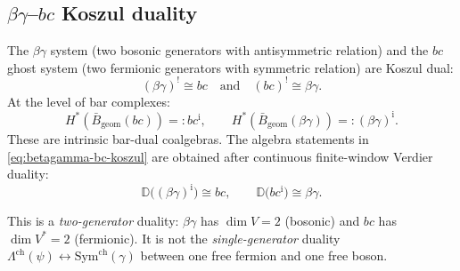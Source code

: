 \subsection{\texorpdfstring{$\beta\gamma$--$bc$}{beta-gamma--bc} Koszul duality}\label{sec:fermion-boson-koszul}

\begin{theorem}\label{thm:betagamma-bc-koszul}
The $\beta\gamma$ system (two bosonic generators with antisymmetric relation) and the $bc$ ghost system (two fermionic generators with symmetric relation) are Koszul dual:
\begin{equation}\label{eq:betagamma-bc-koszul}
(\beta\gamma)^! \cong bc \quad \text{and} \quad (bc)^! \cong \beta\gamma.
\end{equation}
At the level of bar complexes:
\[
H^*(\bar{B}_{\mathrm{geom}}(bc))=:bc^{\mathrm i},\qquad
H^*(\bar{B}_{\mathrm{geom}}(\beta\gamma))
=:(\beta\gamma)^{\mathrm i}.
\]
These are intrinsic bar-dual coalgebras. The algebra statements in
\eqref{eq:betagamma-bc-koszul} are obtained after continuous
finite-window Verdier duality:
\[
\mathbb D\bigl((\beta\gamma)^{\mathrm i}\bigr)\cong bc,\qquad
\mathbb D\bigl(bc^{\mathrm i}\bigr)\cong \beta\gamma.
\]
\end{theorem}

\begin{remark}
This is a \emph{two-generator} duality: $\beta\gamma$ has
$\dim V = 2$ (bosonic) and $bc$ has $\dim V^* = 2$ (fermionic). It is
not the \emph{single-generator} duality
$\Lambda^{\mathrm{ch}}(\psi) \leftrightarrow
\mathrm{Sym}^{\mathrm{ch}}(\gamma)$ between one free fermion and one
free boson.
\end{remark}

